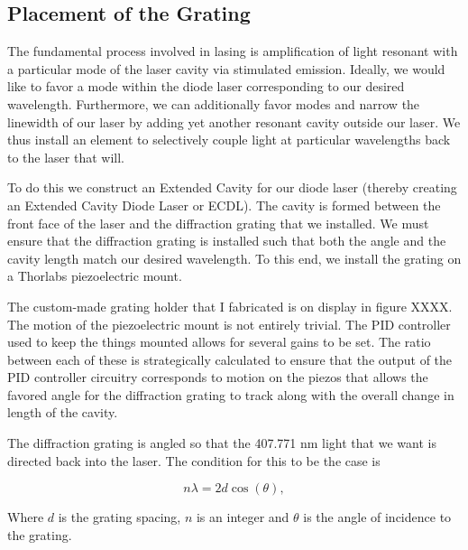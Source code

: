 \subsection{Placement of the Grating}



The fundamental process involved in lasing is amplification of light resonant with a particular mode of the laser cavity via stimulated emission. Ideally, we would like to favor a mode within the diode laser corresponding to our desired wavelength. Furthermore, we can additionally favor modes and narrow the linewidth of our laser by adding yet another resonant cavity outside our laser. We thus install an element to selectively couple light at particular wavelengths back to the laser that will. 

To do this we construct an Extended Cavity for our diode laser (thereby creating an Extended Cavity Diode Laser or ECDL). The cavity is formed between the front face of the laser and the diffraction grating that we installed. We must ensure that the diffraction grating is installed such that both the angle and the cavity length match our desired wavelength. To this end, we install the grating on a Thorlabs piezoelectric mount.

The custom-made grating holder that I fabricated is on display in figure XXXX. 
The motion of the piezoelectric mount is not entirely trivial. The PID controller used to keep the things mounted %
allows for several gains to be set. The ratio between each of these is strategically calculated to ensure that the output of the PID controller circuitry corresponds to motion on the piezos that allows the favored angle for the diffraction grating to track along with the overall change in length of the cavity. 
 
The diffraction grating is angled so that the 407.771 nm light that we want is directed back into the laser. The condition for this to be the case is 

\begin{equation}
n \lambda = 2 d \cos(\theta),
\end{equation}

Where $d$ is the grating spacing, $n$ is an integer and $\theta$ is the angle of incidence to the grating. 

